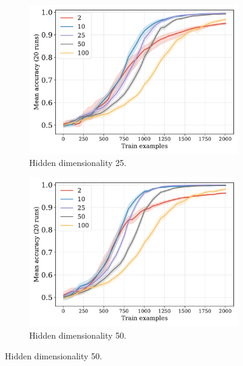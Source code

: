 \documentclass[12pt]{article}
\begin{document}
\begin{figure}[H]
  \begin{subfigure}{0.45\linewidth}
    \includegraphics[width=1\textwidth]{fig/equality-small-train_size-embed_dim-hidden_dim=25.pdf}
    \caption{Hidden dimensionality 25.}
  \end{subfigure}
  \hfill
  \begin{subfigure}{0.45\linewidth}
    \includegraphics[width=1\textwidth]{fig/equality-small-train_size-embed_dim-hidden_dim=50.pdf}
    \caption{Hidden dimensionality 50.}
  \end{subfigure}


\end{figure}
\end{document}
